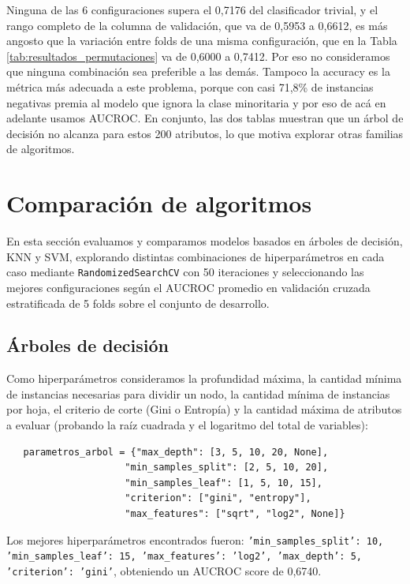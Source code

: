 \documentclass[10pt,a4paper]{article}
\begin{document}
Ninguna de las 6 configuraciones supera el 0,7176 del clasificador trivial, y el rango completo de la columna de validación, que va de 0,5953 a 0,6612, es más angosto que la variación entre folds de una misma configuración, que en la Tabla \ref{tab:resultados_permutaciones} va de 0,6000 a 0,7412. Por eso no consideramos que ninguna combinación sea preferible a las demás. Tampoco la accuracy es la métrica más adecuada a este problema, porque con casi 71,8\% de instancias negativas premia al modelo que ignora la clase minoritaria y por eso de acá en adelante usamos AUCROC. En conjunto, las dos tablas muestran que un árbol de decisión no alcanza para estos 200 atributos, lo que motiva explorar otras familias de algoritmos.


\section{Comparación de algoritmos}
En esta sección evaluamos y comparamos modelos basados en árboles de decisión, KNN y SVM, explorando distintas combinaciones de hiperparámetros en cada caso mediante \texttt{RandomizedSearchCV} con 50 iteraciones y seleccionando las mejores configuraciones según el AUCROC promedio en validación cruzada estratificada de 5 folds sobre el conjunto de desarrollo.

\subsection{Árboles de decisión}
Como hiperparámetros consideramos la profundidad máxima, la cantidad mínima de instancias necesarias para dividir un nodo, la cantidad mínima de instancias por hoja, el criterio de corte (Gini o Entropía) y la cantidad máxima de atributos a evaluar (probando la raíz cuadrada y el logaritmo del total de variables):

\begin{lstlisting}
   parametros_arbol = {"max_depth": [3, 5, 10, 20, None],
                     "min_samples_split": [2, 5, 10, 20], 
                     "min_samples_leaf": [1, 5, 10, 15], 
                     "criterion": ["gini", "entropy"], 
                     "max_features": ["sqrt", "log2", None]} 
\end{lstlisting}

Los mejores hiperparámetros encontrados fueron: 
\texttt{'min\_samples\_split': 10, 
'min\_samples\_leaf': 15, 
'max\_features': 'log2', 
'max\_depth': 5, 
'criterion': 'gini'}, obteniendo un AUCROC score de 0,6740.
\end{document}
